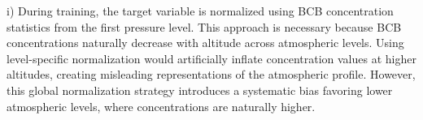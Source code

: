 \documentclass{article}
\begin{document}
    

    i) During training, the target variable is normalized using BCB concentration statistics from the first pressure level. This approach is necessary because BCB concentrations naturally decrease with altitude across atmospheric levels. Using level-specific normalization would artificially inflate concentration values at higher altitudes, creating misleading representations of the atmospheric profile. However, this global normalization strategy introduces a systematic bias favoring lower atmospheric levels, where concentrations are naturally higher. %
\end{document}
